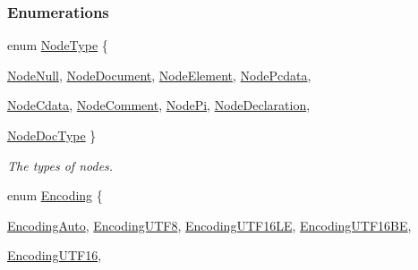 \subsubsection*{Enumerations}
\begin{DoxyCompactItemize}
\item 
enum \hyperlink{namespacephys_1_1xml_a668b0cc666a9d49f7c7222a7552115d3}{NodeType} \{ \par
\hyperlink{namespacephys_1_1xml_a668b0cc666a9d49f7c7222a7552115d3af6e95d4a0b6115c76b339961bc58d742}{NodeNull}, 
\hyperlink{namespacephys_1_1xml_a668b0cc666a9d49f7c7222a7552115d3acfe92e6bd275972917b95f08bd46e09f}{NodeDocument}, 
\hyperlink{namespacephys_1_1xml_a668b0cc666a9d49f7c7222a7552115d3a92facb9678134df6404ce63e7e48624c}{NodeElement}, 
\hyperlink{namespacephys_1_1xml_a668b0cc666a9d49f7c7222a7552115d3ab48d4b88d7a7757e3e8505c90db3b2bf}{NodePcdata}, 
\par
\hyperlink{namespacephys_1_1xml_a668b0cc666a9d49f7c7222a7552115d3a353968e806a751a6da4f7ac115b4ab55}{NodeCdata}, 
\hyperlink{namespacephys_1_1xml_a668b0cc666a9d49f7c7222a7552115d3a25b778cb61ae0a9f15590cad5e0120d2}{NodeComment}, 
\hyperlink{namespacephys_1_1xml_a668b0cc666a9d49f7c7222a7552115d3a3c09d11be0cea840f23f55e084cf72fa}{NodePi}, 
\hyperlink{namespacephys_1_1xml_a668b0cc666a9d49f7c7222a7552115d3a1e3789aa995b7bf563ca8c43553ac035}{NodeDeclaration}, 
\par
\hyperlink{namespacephys_1_1xml_a668b0cc666a9d49f7c7222a7552115d3aca750034b7e4a34d53cfd3399b2bcd99}{NodeDocType}
 \}
\begin{DoxyCompactList}\small\item\em The types of nodes. \item\end{DoxyCompactList}\item 
enum \hyperlink{namespacephys_1_1xml_a420f5de782438f88160321385bea2015}{Encoding} \{ \par
\hyperlink{namespacephys_1_1xml_a420f5de782438f88160321385bea2015a2792ef334e1061e7ad177df463256d85}{EncodingAuto}, 
\hyperlink{namespacephys_1_1xml_a420f5de782438f88160321385bea2015a7793b4cde174342c9450abbeab675743}{EncodingUTF8}, 
\hyperlink{namespacephys_1_1xml_a420f5de782438f88160321385bea2015aa5e6a756e80683f376d1ef0a03b21d56}{EncodingUTF16LE}, 
\hyperlink{namespacephys_1_1xml_a420f5de782438f88160321385bea2015a04fd7b1fef8d2dcc67a46b8fe4dbcaf4}{EncodingUTF16BE}, 
\par
\hyperlink{namespacephys_1_1xml_a420f5de782438f88160321385bea2015ac19070aaf7044426b0fe8fa5af956130}{EncodingUTF16}, 

\end{DoxyCompactItemize}
